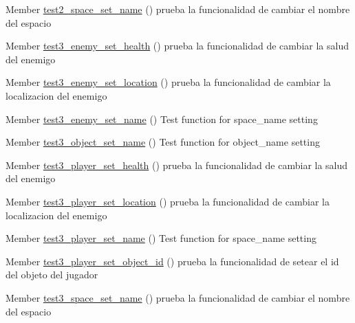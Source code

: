 \begin{DoxyRefList}
\item[Member \mbox{\hyperlink{space__test_8h_a5a868ba017602ba6b58447cb394e81a6}{test2\+\_\+space\+\_\+set\+\_\+name}} ()]\label{test__test000056}%
%
prueba la funcionalidad de cambiar el nombre del espacio  
\item[Member \mbox{\hyperlink{enemy__test_8h_a96bb90aec7fffb1e93652b413ca061e9}{test3\+\_\+enemy\+\_\+set\+\_\+health}} ()]\label{test__test000019}%
%
prueba la funcionalidad de cambiar la salud del enemigo  
\item[Member \mbox{\hyperlink{enemy__test_8h_a63538a95ca81051de3940ff2eeb12b66}{test3\+\_\+enemy\+\_\+set\+\_\+location}} ()]\label{test__test000012}%
%
prueba la funcionalidad de cambiar la localizacion del enemigo  
\item[Member \mbox{\hyperlink{enemy__test_8h_a3722b7ceee474557c230fcbae42789b3}{test3\+\_\+enemy\+\_\+set\+\_\+name}} ()]\label{test__test000005}%
%
Test function for space\+\_\+name setting  
\item[Member \mbox{\hyperlink{object__test_8h_ab40669b5d083b6484197d917fb6882b1}{test3\+\_\+object\+\_\+set\+\_\+name}} ()]\label{test__test000026}%
%
Test function for object\+\_\+name setting  
\item[Member \mbox{\hyperlink{player__test_8h_a4362c7c5ed2240375f328c6276d19af1}{test3\+\_\+player\+\_\+set\+\_\+health}} ()]\label{test__test000047}%
%
prueba la funcionalidad de cambiar la salud del enemigo  
\item[Member \mbox{\hyperlink{player__test_8h_a317c0c84ef6ef843c15d5bab4a6b8a38}{test3\+\_\+player\+\_\+set\+\_\+location}} ()]\label{test__test000040}%
%
prueba la funcionalidad de cambiar la localizacion del enemigo  
\item[Member \mbox{\hyperlink{player__test_8h_a447ebbb4ba2206abeaf4b60200e312da}{test3\+\_\+player\+\_\+set\+\_\+name}} ()]\label{test__test000033}%
%
Test function for space\+\_\+name setting  
\item[Member \mbox{\hyperlink{player__test_8h_ae00f739562ae554e76a4e1e5961420ef}{test3\+\_\+player\+\_\+set\+\_\+object\+\_\+id}} ()]\label{test__test000050}%
%
prueba la funcionalidad de setear el id del objeto del jugador  
\item[Member \mbox{\hyperlink{space__test_8h_aa24a337830006e33706ab6ac1c416b47}{test3\+\_\+space\+\_\+set\+\_\+name}} ()]\label{test__test000057}%
%
prueba la funcionalidad de cambiar el nombre del espacio 
\end{DoxyRefList}